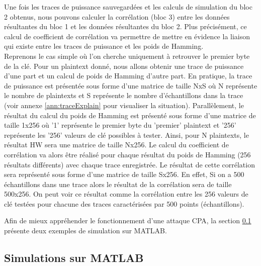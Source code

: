 \documentclass[oneside]{book}
\begin{document}
Une fois les traces de puissance sauvegardées et les calculs de simulation du bloc 2 obtenus, nous pouvons calculer la corrélation (bloc 3) entre les données résultantes du bloc 1 et les données résultantes du bloc 2. Plus précisément, ce calcul de coefficient de corrélation va permettre de mettre en évidence la liaison qui existe entre les traces de puissance et les poids de Hamming. \\ 
Reprenons le cas simple où l'on cherche uniquement à retrouver le premier byte de la clé. Pour un plaintext donné, nous allons obtenir une trace de puissance d'une part et un calcul de poids de Hamming d'autre part. En pratique, la trace de puissance est présentée sous forme d'une matrice de taille NxS où N représente le nombre de plaintexts et S représente le nombre d'échantillons dans la trace (voir annexe \ref{ann:traceExplain} pour visualiser la situation). Parallèlement, le résultat du calcul du poids de Hamming est présenté sous forme d'une matrice de taille 1x256 où '1' représente le premier byte du 'premier' plaintext et '256' représente les '256' valeurs de clé possibles à tester. Ainsi, pour N plaintexts, le résultat HW sera une matrice de taille Nx256. Le calcul du coefficient de corrélation va alors être réalisé pour chaque résultat du poids de Hamming (256 résultats différents) avec chaque trace enregistrée. Le résultat de cette corrélation sera représenté sous forme d'une matrice de taille Sx256. En effet, Si on a 500 échantillons dans une trace alors le résultat de la corrélation sera de taille 500x256. On peut voir ce résultat comme la corrélation entre les 256 valeurs de clé testées pour chacune des traces caractérisées par 500 points (échantillons).

Afin de mieux appréhender le fonctionnement d'une attaque CPA, la section \ref{sec:simulCPA} présente deux exemples de simulation sur MATLAB.








\newpage

\subsection{Simulations sur MATLAB}
\label{sec:simulCPA}
\end{document}
